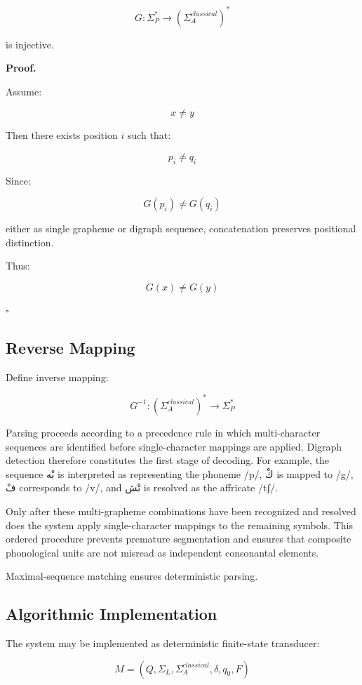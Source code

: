 \documentclass[12pt]{article}
\newcommand{\AR}[1]{\foreignlanguage{arabic}{#1}}
\begin{document}
\[
G : \Sigma_P^* \rightarrow (\Sigma_A^{classical})^*
\]

is injective.

\textbf{Proof.}

Assume:

\[
x \neq y
\]

Then there exists position \( i \) such that:

\[
p_i \neq q_i
\]

Since:

\[
G(p_i) \neq G(q_i)
\]

either as single grapheme or digraph sequence, concatenation preserves positional distinction.

Thus:

\[
G(x) \neq G(y)
\]

\hfill \( \square \)

\subsection{Reverse Mapping}

Define inverse mapping:

\[
G^{-1} : (\Sigma_A^{classical})^* \rightarrow \Sigma_P^*
\]

Parsing proceeds according to a precedence rule in which multi-character sequences are identified before single-character mappings are applied. Digraph detection therefore constitutes the first stage of decoding. For example, the sequence \AR{بْه} is interpreted as representing the phoneme /p/, \AR{كْ} is mapped to /g/, \AR{فْ} corresponds to /v/, and \AR{تْش} is resolved as the affricate /tʃ/.

Only after these multi-grapheme combinations have been recognized and resolved does the system apply single-character mappings to the remaining symbols. This ordered procedure prevents premature segmentation and ensures that composite phonological units are not misread as independent consonantal elements.

Maximal-sequence matching ensures deterministic parsing.

\subsection{Algorithmic Implementation}

The system may be implemented as deterministic finite-state transducer:

\[
M = (Q, \Sigma_L, \Sigma_A^{classical}, \delta, q_0, F)
\]
\end{document}
